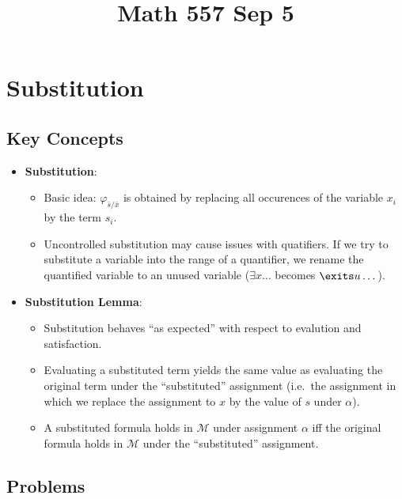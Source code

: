 \documentclass[
]{article}
\title{Math 557 Sep 5}
\author{}
\date{}
\providecommand{\tightlist}{%
  \setlength{\itemsep}{0pt}\setlength{\parskip}{0pt}}
\theoremstyle{definition}
\theoremstyle{remark}
\begin{document}
\maketitle


\section{Substitution}\label{substitution}

\subsection{Key Concepts}\label{key-concepts}

\begin{itemize}
\item
  \textbf{Substitution}:

  \begin{itemize}
  \tightlist
  \item
    Basic idea: \(\varphi_{\bar{s}/\bar{x}}\) is obtained by replacing
    all occurences of the variable \(x_i\) by the term \(s_i\).
  \item
    Uncontrolled substitution may cause issues with quatifiers. If we
    try to substitute a variable into the range of a quantifier, we
    rename the quantified variable to an unused variable
    (\(\exists x \dots\) becomes \(\exits u \dots\)).
  \end{itemize}
\item
  \textbf{Substitution Lemma}:

  \begin{itemize}
  \tightlist
  \item
    Substitution behaves ``as expected'' with respect to evalution and
    satisfaction.
  \item
    Evaluating a substituted term yields the same value as evaluating
    the original term under the ``substituted'' assignment (i.e.~the
    assignment in which we replace the assignment to \(x\) by the value
    of \(s\) under \(\alpha\)).
  \item
    A substituted formula holds in \(\mathcal{M}\) under assignment
    \(\alpha\) iff the original formula holds in \(\mathcal{M}\) under
    the ``substituted'' assignment.
  \end{itemize}
\end{itemize}

\subsection{Problems}\label{problems}
\end{document}
